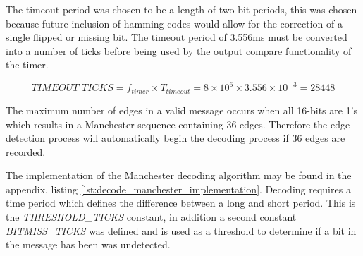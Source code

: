 The timeout period was chosen to be a length of two bit-periods, this was chosen because future inclusion of hamming codes would allow for the correction of a single flipped or missing bit. The timeout period of 3.556ms must be converted into a number of ticks before being used by the output compare functionality of the timer.

\[TIMEOUT\_TICKS = f_{timer} \times T_{timeout} = 8 \times 10^6 \times 3.556 \times 10^{-3} = 28448\]

The maximum number of edges in a valid message occurs when all 16-bits are 1's which results in a Manchester sequence containing 36 edges. Therefore the edge detection process will automatically begin the decoding process if 36 edges are recorded.

The implementation of the Manchester decoding algorithm may be found in the appendix, listing \ref{lst:decode_manchester_implementation}. Decoding requires a time period which defines the difference between a long and short period. This is the \textit{THRESHOLD\_TICKS} constant, in addition a second constant \textit{BITMISS\_TICKS} was defined and is used as a threshold to determine if a bit in the message has been was undetected.









